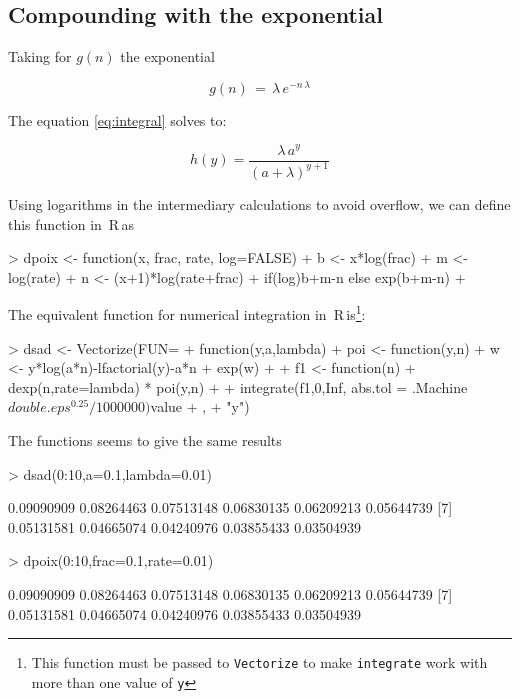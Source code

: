 \documentclass{article}
\newcommand{\R}{{\sf \,R\,}}
\newcommand{\code}[1]{\texttt{#1}}
\begin{document}
\subsection*{Compounding with the exponential}

Taking for $g(n)$ the exponential

\begin{equation}
  \label{equation}
  g(n)\, = \, \lambda\,{e}^{-n\,\lambda}
\end{equation}

The equation \ref{eq:integral} solves to:


\begin{equation}
  \label{eq:poiexp}
  h(y) = \frac{\lambda \, a^y}{(a+\lambda)^{y+1}}
\end{equation}

Using logarithms in the intermediary calculations to avoid overflow, we can define this function in \R as

\begin{Schunk}
\begin{Sinput}
> dpoix <- function(x, frac, rate, log=FALSE) {
+ 	  b <- x*log(frac)
+ 	  m <- log(rate)
+ 	  n <- (x+1)*log(rate+frac)
+           if(log)b+m-n else exp(b+m-n)
+         }
\end{Sinput}
\end{Schunk}


The equivalent function for numerical integration in \R is\footnote{This function must be passed to \code{Vectorize} to make \code{integrate} work with more than one  value of \code{y}}:


\begin{Schunk}
\begin{Sinput}
> dsad <- Vectorize(FUN=
+                   function(y,a,lambda){
+                     poi <- function(y,n){
+                       w <- y*log(a*n)-lfactorial(y)-a*n
+                       exp(w)
+                     }
+                     f1 <- function(n){
+                       dexp(n,rate=lambda) * poi(y,n)
+                     }
+                     integrate(f1,0,Inf, abs.tol = .Machine$double.eps^0.25/1000000)$value
+                   },
+                   "y")
\end{Sinput}
\end{Schunk}

The functions seems to give the same results

\begin{Schunk}
\begin{Sinput}
> dsad(0:10,a=0.1,lambda=0.01)
\end{Sinput}
\begin{Soutput}
 [1] 0.09090909 0.08264463 0.07513148 0.06830135 0.06209213 0.05644739
 [7] 0.05131581 0.04665074 0.04240976 0.03855433 0.03504939
\end{Soutput}
\begin{Sinput}
> dpoix(0:10,frac=0.1,rate=0.01)
\end{Sinput}
\begin{Soutput}
 [1] 0.09090909 0.08264463 0.07513148 0.06830135 0.06209213 0.05644739
 [7] 0.05131581 0.04665074 0.04240976 0.03855433 0.03504939
\end{Soutput}
\end{Schunk}
\end{document}
